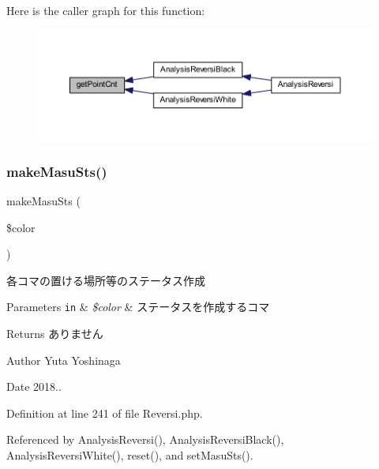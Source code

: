 Here is the caller graph for this function\+:
\nopagebreak
\begin{figure}[H]
\begin{center}
\leavevmode
\includegraphics[width=350pt]{class_reversi_af538d04718f177f71461f582f3bd8eba_icgraph}
\end{center}
\end{figure}
\mbox{\label{class_reversi_a88869682786bb7c45c3488113deaa789}} 
\subsubsection{\texorpdfstring{make\+Masu\+Sts()}{makeMasuSts()}}
{\footnotesize\ttfamily make\+Masu\+Sts (\begin{DoxyParamCaption}\item[{}]{\$color }\end{DoxyParamCaption})\hspace{0.3cm}{\ttfamily [private]}}



各コマの置ける場所等のステータス作成 


\begin{DoxyParams}[1]{Parameters}
\mbox{\tt in}  & {\em \$color} & ステータスを作成するコマ \\
\hline
\end{DoxyParams}
\begin{DoxyReturn}{Returns}
ありません 
\end{DoxyReturn}
\begin{DoxyAuthor}{Author}
Yuta Yoshinaga 
\end{DoxyAuthor}
\begin{DoxyDate}{Date}
2018.. 
\end{DoxyDate}


Definition at line 241 of file Reversi.\+php.



Referenced by Analysis\+Reversi(), Analysis\+Reversi\+Black(), Analysis\+Reversi\+White(), reset(), and set\+Masu\+Sts().

